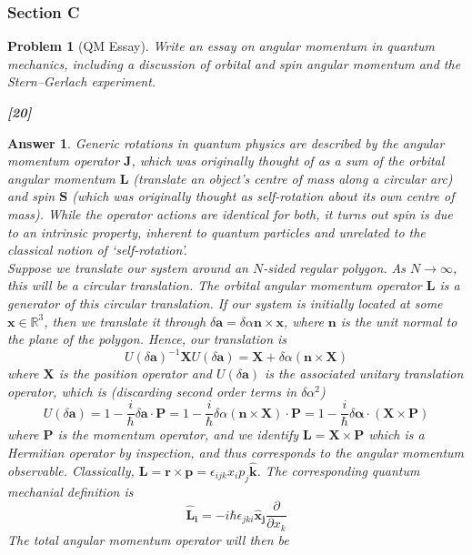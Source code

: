 \documentclass[a4paper]{article}
\newtheorem{ans}{Answer}[subsection]
\theoremstyle{new}
\newtheorem{qns}{Problem}[subsection]
\begin{document}
\subsubsection{Section C}
\begin{qns}[QM Essay]
Write an essay on angular momentum in quantum mechanics, including a discussion of orbital and spin angular momentum and the Stern–Gerlach experiment.

\hfill\textbf{[20]}
\end{qns}
\begin{ans}
Generic rotations in quantum physics are described by the angular momentum operator $\mathbf{J}$, which was originally thought of as a sum of the orbital angular momentum $\mathbf{L}$ (translate an object's centre of mass along a circular arc) and spin $\mathbf{S}$ (which was originally thought as self-rotation about its own centre of mass). While the operator actions are identical for both, it turns out spin is due to an intrinsic property, inherent to quantum particles and unrelated to the classical notion of `self-rotation'.\\[5pt]
Suppose we translate our system around an $N$-sided regular polygon. As $N\rightarrow\infty$, this will be a circular translation. The orbital angular momentum operator $\mathbf{L}$ is a generator of this circular translation. If our system is initially located at some $\mathbf{x}\in\mathbb{R}^3$, then we translate it through $\delta\mathbf{a}=\delta\alpha\mathbf{n}\times\mathbf{x}$, where $\mathbf{n}$ is the unit normal to the plane of the polygon. Hence, our translation is
$$U(\delta\mathbf{a})^{-1}\mathbf{X}U(\delta\mathbf{a})=\mathbf{X}+\delta\alpha(\mathbf{n}\times\mathbf{X})$$
where $\mathbf{X}$ is the position operator and $U(\delta\mathbf{a})$ is the associated unitary translation operator, which is (discarding second order terms in $\delta\alpha^2$)
$$U(\delta\mathbf{a})=1-\frac{i}{\hbar}\delta\mathbf{a}\cdot\mathbf{P}=1-\frac{i}{\hbar}\delta\alpha(\mathbf{n}\times\mathbf{X})\cdot\mathbf{P}=1-\frac{i}{\hbar}\delta\boldsymbol{\alpha}\cdot(\mathbf{X}\times\mathbf{P})$$
where $\mathbf{P}$ is the momentum operator, and we identify $\mathbf{L}=\mathbf{X}\times\mathbf{P}$ which is a Hermitian operator by inspection, and thus corresponds to the angular momentum observable. Classically,  $\mathbf{L}=\mathbf{r}\times\mathbf{p}=\epsilon_{ijk}x_ip_j\mathbf{\hat{k}}$. The corresponding quantum mechanial definition is
$$\mathbf{\hat{L}_i}=-i\hbar\epsilon_{jki}\mathbf{\hat{x}_j}\frac{\partial}{\partial x_k}$$ 
The total angular momentum operator will then be 

\end{ans}
\end{document}
